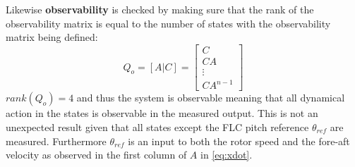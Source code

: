 \smallskip
Likewise \textbf{observability} is checked by making sure that the rank of the observability matrix is equal to the number of states with the observability matrix being defined:
\begin{equation}\label{eq:observability}
	Q_o = [A|C] = \begin{bmatrix}
		C \\ CA \\ \vdots \\ CA^{n-1}
	\end{bmatrix}
\end{equation}
$ rank(Q_o) = 4 $ and thus the system is observable meaning that all dynamical action in the states is observable in the measured output. This is not an unexpected result given that all states except the FLC pitch reference $ \theta_{ref} $ are measured. Furthermore $ \theta_{ref} $ is an input to both the rotor speed and the fore-aft velocity as observed in the first column of $ A $ in \cref{eq:xdot}.



